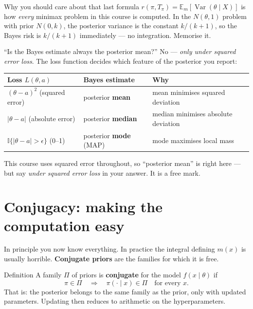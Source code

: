 \documentclass[11pt]{article}
\newcommand{\E}{\mathbb{E}}
\newcommand{\Var}{\operatorname{Var}}
\newcommand{\I}{\mathbb{I}}
\begin{document}
\begin{idea}{Why you should care about that last formula}
$r(\pi,T_\pi)=\E_m[\Var(\theta\mid X)]$ is how \emph{every} minimax problem in this course is
computed. In the $N(\theta,1)$ problem with prior $N(0,k)$, the posterior variance is the
constant $k/(k+1)$, so the Bayes risk is $k/(k+1)$ immediately --- no integration. Memorise
it.
\end{idea}

\begin{confusion}{``Is the Bayes estimate always the posterior mean?''}
No --- \emph{only under squared error loss}. The loss function decides which feature of the
posterior you report:
\begin{center}
\begin{tabular}{@{}lll@{}}
\toprule
Loss $L(\theta,a)$ & Bayes estimate & Why \\
\midrule
$(\theta-a)^2$ (squared error) & posterior \textbf{mean} & mean minimises squared deviation \\
$|\theta-a|$ (absolute error) & posterior \textbf{median} & median minimises absolute deviation \\
$\I\{|\theta-a|>\epsilon\}$ (0--1) & posterior \textbf{mode} (MAP) & mode maximises local mass \\
\bottomrule
\end{tabular}
\end{center}
This course uses squared error throughout, so ``posterior mean'' is right here --- but say
\emph{under squared error loss} in your answer. It is a free mark.
\end{confusion}

\section{Conjugacy: making the computation easy}

In principle you now know everything. In practice the integral defining $m(x)$ is usually
horrible. \textbf{Conjugate priors} are the families for which it is free.

\begin{idea}{Definition}
A family $\Pi$ of priors is \textbf{conjugate} for the model $f(x\mid\theta)$ if
\[
\pi\in\Pi\quad\Longrightarrow\quad \pi(\cdot\mid x)\in\Pi\quad\text{for every }x.
\]
That is: the posterior belongs to the same family as the prior, only with updated parameters.
Updating then reduces to arithmetic on the hyperparameters.
\end{idea}
\end{document}
